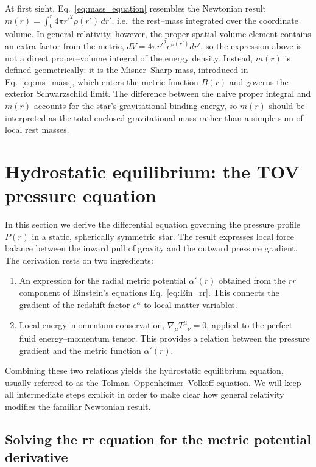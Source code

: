 At first sight, Eq.~\eqref{eq:mass_equation} resembles the Newtonian result 
$m(r)=\int_0^r 4\pi r'^2 \rho(r')\,dr'$, i.e.\ the rest--mass integrated over the coordinate volume. 
In general relativity, however, the proper spatial volume element contains an extra factor from the 
metric, $dV = 4\pi r'^2 e^{\beta(r')}dr'$, so the expression above is not a direct proper--volume 
integral of the energy density. Instead, $m(r)$ is defined geometrically: it is the Misner--Sharp 
mass, introduced in Eq.~\eqref{eq:ms_mass}, which enters the metric function $B(r)$ and governs the 
exterior Schwarzschild limit. The difference between the naive proper integral and $m(r)$ accounts 
for the star’s gravitational binding energy, so $m(r)$ should be interpreted as the total enclosed 
gravitational mass rather than a simple sum of local rest masses.


\section{Hydrostatic equilibrium: the TOV pressure equation}

In this section we derive the differential equation governing the pressure profile $P(r)$ 
in a static, spherically symmetric star. The result expresses local force balance between the 
inward pull of gravity and the outward pressure gradient. The derivation rests on two ingredients:
\begin{enumerate}
\item An expression for the radial metric potential $\alpha'(r)$ obtained from the 
$rr$ component of Einstein’s equations Eq.~\eqref{eq:Ein_rr}. 
This connects the gradient of the redshift factor $e^{\alpha}$ to local matter variables.
\item Local energy--momentum conservation, $\nabla_{\mu}T^{\mu}{}_{\nu}=0$, applied to 
the perfect fluid energy--momentum tensor. 
This provides a relation between the pressure gradient and the metric function $\alpha'(r)$.
\end{enumerate}
Combining these two relations yields the hydrostatic equilibrium equation, usually referred 
to as the Tolman--Oppenheimer--Volkoff equation. We will keep all intermediate steps 
explicit in order to make clear how general relativity modifies the familiar Newtonian result.

\subsection*{Solving the rr equation for the metric potential derivative}

